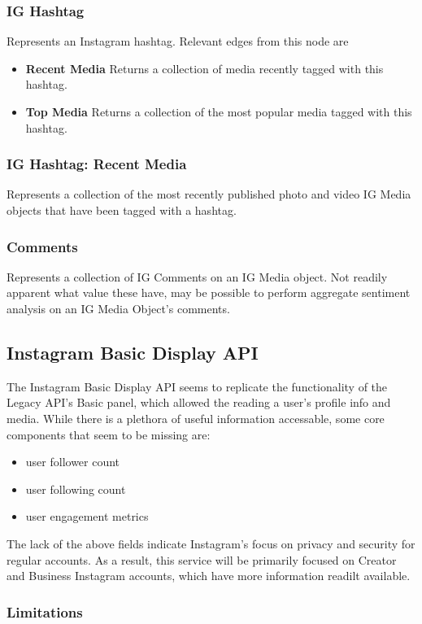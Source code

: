 \subsubsection{IG Hashtag}
Represents an Instagram hashtag. Relevant edges from this node are
\begin{itemize}
    \item \textbf{Recent Media} Returns a collection of media recently tagged with this hashtag.
    \item \textbf{Top Media} Returns a collection of the most popular media tagged with this hashtag.
\end{itemize}

\subsubsection{IG Hashtag: Recent Media}
Represents a collection of the most recently published photo and video IG Media objects that have been tagged with a hashtag.

\subsubsection{Comments}
Represents a collection of IG Comments on an IG Media object. Not readily apparent what value these have,
may be possible to perform aggregate sentiment analysis on an IG Media Object's comments.

\subsection{Instagram Basic Display API}
The Instagram Basic Display API seems to replicate the functionality of the Legacy API's Basic panel, 
which allowed the reading a user's profile info and media. While there is a plethora of useful information accessable,
some core components that seem to be missing are:
\begin{itemize}
    \item user follower count
    \item user following count
    \item user engagement metrics
\end{itemize}
The lack of the above fields indicate Instagram's focus on privacy and security for regular accounts.
As a result, this service will be primarily focused on Creator and Business Instagram accounts,
which have more information readilt available.
\subsubsection{Limitations}
